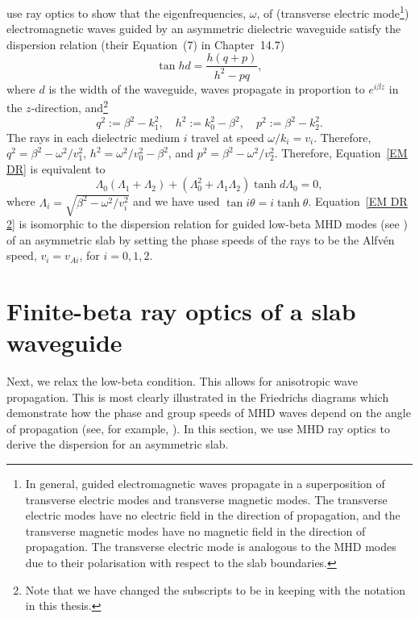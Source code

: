 	\cite{ram_etal84} use ray optics to show that the eigenfrequencies, $\omega$, of (transverse electric mode\footnote{In general, guided electromagnetic waves propagate in a superposition of transverse electric modes and transverse magnetic modes. The transverse electric modes have no electric field in the direction of propagation, and the transverse magnetic modes have no magnetic field in the direction of propagation. The transverse electric mode is analogous to the MHD modes due to their polarisation with respect to the slab boundaries.}) electromagnetic waves guided by an asymmetric dielectric waveguide satisfy the dispersion relation (their Equation~(7) in Chapter~14.7)
	\begin{equation}
	\tan{hd} = \frac{h(q + p)}{h^2 - pq}, \label{EM DR}
	\end{equation}
	where $d$ is the width of the waveguide, waves propagate in proportion to $e^{i\beta z}$ in the $z$-direction, and\footnote{Note that we have changed the subscripts to be in keeping with the notation in this thesis.} 
	\begin{equation}
	q^2 := \beta^2 - k_1^2, \quad h^2 := k_0^2 - \beta^2, \quad p^2 := \beta^2 - k_2^2.
	\end{equation}
	The rays in each dielectric medium $i$ travel at speed $\omega/k_i = v_i$. Therefore, $q^2 = \beta^2 - \omega^2/v_1^2$, $h^2 = \omega^2/v_0^2 - \beta^2$, and $p^2 = \beta^2 - \omega^2/v_2^2$. Therefore, Equation~\eqref{EM DR} is equivalent to
	\begin{equation}
	\Lambda_0(\Lambda_1 + \Lambda_2) + (\Lambda_0^2 + \Lambda_1\Lambda_2)\tanh{d\Lambda_0} = 0, \label{EM DR 2}
	\end{equation}
	where $\Lambda_i = \sqrt{\beta^2 - \omega^2/v_i^2}$ and we have used $\tan{i\theta} = i \tanh{\theta}$. Equation~\eqref{EM DR 2} is isomorphic to the dispersion relation for guided low-beta MHD modes (see \citealp{all_etal17}) of an asymmetric slab by setting the phase speeds of the rays to be the Alfv\'{e}n speed, $v_i = v_{Ai}$, for $i = 0, 1, 2$.
	
	
	\section{Finite-beta ray optics of a slab waveguide}
	\label{sec: finite beta}
	
	Next, we relax the low-beta condition. This allows for anisotropic wave propagation. This is most clearly illustrated in the Friedrichs diagrams which demonstrate how the phase and group speeds of MHD waves depend on the angle of propagation (see, for example, \citealp{goe_etal04,pri14}). In this section, we use MHD ray optics to derive the dispersion for an asymmetric slab.
	
